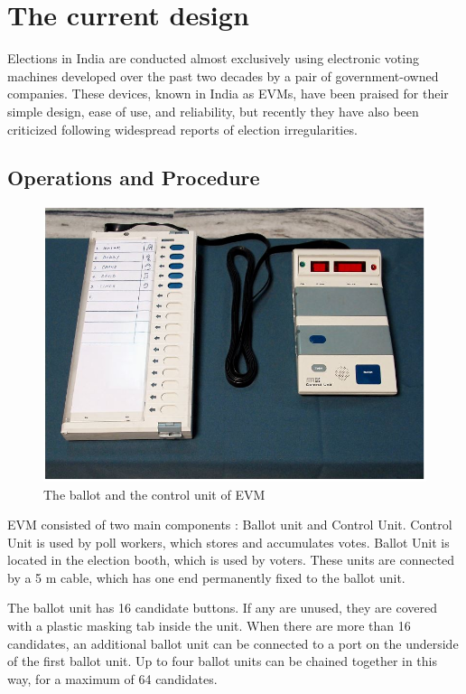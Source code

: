 \documentclass[a4paper,12pt,openany]{book}
\begin{document}
\chapter{The current design}
Elections in India are conducted almost exclusively using electronic voting machines developed over
the past two decades by a pair of government-owned companies. These devices, known in India as EVMs,
have been praised for their simple design, ease of use, and reliability, but recently they have also been
criticized following widespread reports of election irregularities.

\section{Operations and Procedure}
\begin{figure}[!h]
\centering
\includegraphics[scale=0.5]{EVM_with_Control_Unit.JPG}
\caption{The ballot and the control unit of EVM}
\end{figure}
\newpage
EVM consisted of two main components : Ballot unit and Control Unit.
Control Unit is used by poll
workers, which stores and accumulates votes.
Ballot Unit
is located in the election booth, which is
used by voters. These units are connected by a 5 m cable, which has one end permanently fixed to the ballot
unit.


The ballot unit has 16 candidate buttons. If any are unused, they are covered with a plastic masking tab
inside the unit. When there are more than 16 candidates, an additional ballot unit can be connected to a port on
the underside of the first ballot unit. Up to four ballot units can be chained together in this way, for a maximum
of 64 candidates.\\
\end{document}
